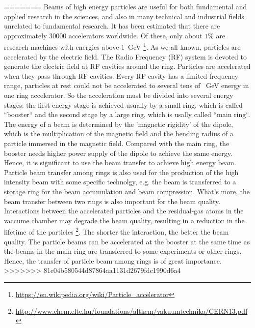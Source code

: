 =======
Beams of high energy particles are useful for both fundamental and applied research in the sciences, and also in many technical and industrial fields unrelated to fundamental research. It has been estimated that there are approximately 30000 accelerators worldwide. Of these, only about $1\%$ are research machines with energies above \SI{1}{GeV} \footnote{\url{https://en.wikipedia.org/wiki/Particle_accelerator}}.  As we all known, particles are accelerated by the electric field. The Radio Frequency (RF) system is devoted to generate the electric field at RF cavities around the ring. Particles are accelerated when they pass through RF cavities. Every RF cavity has a limited frequency range,  particles at rest could not be accelerated to several tens of \SI{}{GeV} energy in one ring accelerator.  So the acceleration must be divided into several energy stages: the first energy stage is achieved usually by a small ring, which is called ``booster`` and the second stage by a large ring, which is usally called ``main ring``.  The energy of a beam is determined by the 'magnetic rigidity' of the dipole, which is the multiplication of the magnetic field and the bending radius of a particle immersed in the magnetic field. Compared with the main ring, the booster needs higher power supply of the dipole to achieve the same energy. Hence, it is significant to use  the beam transfer to achieve high energy beam. Particle beam transfer among rings is also used for the production of the high intensity beam with some specific technolgy, e.g. the beam is transferred to a storage ring for the beam accumulation and beam compression. What's more, the beam transfer between two rings is also important for the beam quality.  Interactions  between  the accelerated particles and the residual-gas atoms in the vaccume chamber may degrade the beam quality, resulting in a reduction in the lifetime of the particles \footnote{\url{http://www.chem.elte.hu/foundations/altkem/vakuumtechnika/CERN13.pdf}}. The shorter the interaction, the better the beam quality. The particle beams can be accelerated at the booster at the same time as the beams in the main ring are transferred to some experiments or other rings. Hence, the transfer of particle beam among rings is of great importance.
>>>>>>> 81e04b580544d87864aa1131d2679fdc1990d6a4
%
